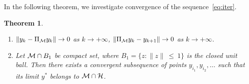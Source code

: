 \documentclass[sii]{ipart}
\newtheorem{theorem}{Theorem}
\begin{document}
In the following theorem, we investigate convergence of the sequence~\eqref{eq:iter}.

\begin{theorem}
	\label{th:converg}
	\begin{enumerate}
		Let the conditions of Proposition~\ref{prop:pythaprop} be fulfilled and also the set $\calM$ be closed under the limit operation. Then
		\item $\|y_k - \Pi_{\mathcal{M}}y_k\| \to 0$ as $k \to +\infty$, $\|\Pi_{\mathcal{M}}y_k - y_{k+1}\| \to 0$ as $k \to +\infty$.
		\item Let $\mathcal{M} \cap B_1$ be compact set, where $B_1=\{z: \|z\|~\le~1\}$ is the closed unit ball. Then there exists a convergent subsequence of points $y_{i_1}, y_{i_2}, \ldots$ such that its limit $y^*$ belongs to $\mathcal{M} \cap \mathcal{H}$.
	\end{enumerate}
\end{theorem}
\end{document}
